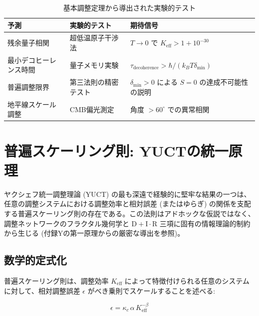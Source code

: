 \documentclass[11pt,a4paper]{article}
\begin{document}
	\begin{table}[htbp]
		\centering
		\small
	
			\begin{tabular}{p{}p{}p{}}
				\toprule
				\textbf{予測} & \textbf{実験的テスト} & \textbf{期待信号} \\
				\midrule
				残余量子相関 & 超低温原子干渉法 & $T \to 0$ で $K_{\mathrm{eff}} > 1 + 10^{-30}$ \\
				最小デコヒーレンス時間 & 量子メモリ実験 & $\tau_{\text{decoherence}} > \hbar/(k_B T \delta_{\min})$ \\
				普遍調整限界 & 第三法則の精密テスト & $\delta_{\min}>0$ による $S=0$ の達成不可能性の説明 \\
				地平線スケール調整 & CMB偏光測定 & 角度 $>60^\circ$ での異常相関 \\
				\bottomrule
			\end{tabular}
	
		\caption{基本調整定理から導出された実験的テスト}
		\label{tab:theorem-predictions}
	\end{table}
	
	\section{普遍スケーリング則: YUCTの統一原理}
	\label{sec:universal_scaling}
	
	ヤクシェフ統一調整理論 (YUCT) の最も深遠で経験的に堅牢な結果の一つは、任意の調整システムにおける調整効率と相対誤差 (またはゆらぎ) の関係を支配する普遍スケーリング則の存在である。この法則はアドホックな仮説ではなく、調整ネットワークのフラクタル幾何学と $\mathrm{D} + \mathrm{I}\cdot \mathrm{R}$ 三項に固有の情報理論的制約から生じる (付録Yの第一原理からの厳密な導出を参照)。
	
	\subsection{数学的定式化}
	
	普遍スケーリング則は、調整効率 $K_{\mathrm{eff}}$ によって特徴付けられる任意のシステムに対して、相対調整誤差 $\epsilon$ がべき乗則でスケールすることを述べる:
	
	\begin{equation}
		\boxed{\epsilon = \kappa_c \, \alpha \, K_{\mathrm{eff}}^{-\beta}}
		\label{eq:universal_scaling}
	\end{equation}
	
\end{document}
